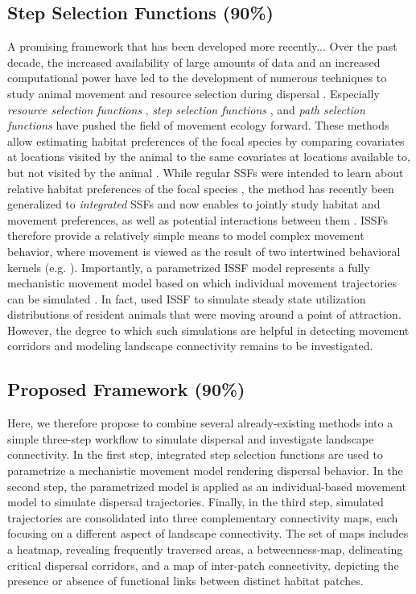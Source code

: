 \documentclass[abstract=on,10pt,a4paper,bibliography=totocnumbered]{article}
\begin{document}
\subsection{Step Selection Functions (90\%)}
A promising framework that has been developed more recently...
Over the past decade, the increased availability of large amounts of data and an
increased computational power have led to the development of numerous techniques
to study animal movement and resource selection during dispersal
\citep{Boyce.2002, Fortin.2005, Cushman.2010, Zeller.2012}. Especially
\textit{resource selection functions} \citep{Boyce.2002}, \textit{step selection
functions} \citep{Fortin.2005}, and \textit{path selection functions}
\citep{Cushman.2010} have pushed the field of movement ecology forward. These
methods allow estimating habitat preferences of the focal species by comparing
covariates at locations visited by the animal to the same covariates at
locations available to, but not visited by the animal \citep{Boyce.2002,
Fortin.2005, Cushman.2010, Thurfjell.2014}. While regular SSFs were intended to
learn about relative habitat preferences of the focal species
\citep{Fortin.2005, Thurfjell.2014, Avgar.2017}, the method has recently been
generalized to \textit{integrated} SSFs and now enables to jointly study habitat
and movement preferences, as well as potential interactions between them
\citep{Avgar.2016, Signer.2017, Fieberg.2020}. ISSFs therefore provide a
relatively simple means to model complex movement behavior, where movement is
viewed as the result of two intertwined behavioral kernels (e.g.
\citealp{Prokopenko.2017, Munden.2020}). Importantly, a parametrized ISSF model
represents a fully mechanistic movement model based on which individual movement
trajectories can be simulated \citep{Avgar.2016, Signer.2017}. In fact,
\cite{Signer.2017} used ISSF to simulate steady state utilization distributions
of resident animals that were moving around a point of attraction. However, the
degree to which such simulations are helpful in detecting movement corridors and
modeling landscape connectivity remains to be investigated.

\subsection{Proposed Framework (90\%)}
Here, we therefore propose to combine several already-existing methods into a
simple three-step workflow to simulate dispersal and investigate landscape
connectivity. In the first step, integrated step selection functions are used to
parametrize a mechanistic movement model rendering dispersal behavior. In the
second step, the parametrized model is applied as an individual-based movement
model to simulate dispersal trajectories. Finally, in the third step, simulated
trajectories are consolidated into three complementary connectivity maps, each
focusing on a different aspect of landscape connectivity. The set of maps
includes a heatmap, revealing frequently traversed areas, a betweenness-map,
delineating critical dispersal corridors, and a map of inter-patch connectivity,
depicting the presence or absence of functional links between distinct habitat
patches.
\end{document}
